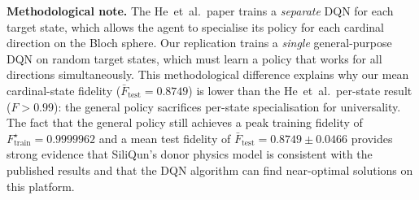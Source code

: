 \begin{table}[ht]
\centering
\caption{Replication~2 results: DQN universal state preparation on
  SiliQun \texttt{donor\_electron} profile (5 seeds), shown side by
  side with published targets of He~et~al.~\cite{He2021}.
  Published values use separate specialist agents per state;
  ours uses a single general-purpose DQN.
  $\bar{F}_\text{test}$ = mean test fidelity across 5 seeds;
  $F_\text{train}^\star$ = best training fidelity across 5 seeds.}
\label{tab:r2_results}
\end{table}

\textbf{Methodological note.} The He~et~al.\ paper trains a \emph{separate}
DQN for each target state, which allows the agent to specialise its policy
for each cardinal direction on the Bloch sphere.
Our replication trains a \emph{single} general-purpose DQN on random target
states, which must learn a policy that works for all directions
simultaneously.
This methodological difference explains why our mean cardinal-state fidelity
($\bar{F}_\text{test} = 0.8749$) is lower than the He~et~al.\ per-state result
($F > 0.99$): the general policy sacrifices per-state specialisation for
universality.
The fact that the general policy still achieves a peak training fidelity of
$F_\text{train}^\star = 0.9999962$ and a mean test fidelity of
$\bar{F}_\text{test} = 0.8749 \pm 0.0466$ provides strong evidence that
SiliQun's donor physics model is consistent with the published results and
that the DQN algorithm can find near-optimal solutions on this platform.

